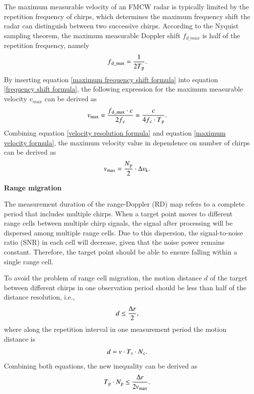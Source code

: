\documentclass[12pt,DIV14,BCOR12mm,a4paper,footinclude=false,headinclude,parskip=half-,twoside,openright,cleardoublepage=empty,toc=index,bibliography=totoc,listof=totoc]{scrreprt}
\numberwithin{equation}{chapter}
\begin{document}
The maximum measurable velocity of an FMCW radar is typically limited by the repetition frequency of chirps, which determines the maximum frequency shift the radar can distinguish between two successive chirps. According to the Nyquist sampling theorem, the maximum measurable Doppler shift $f_{d \_ max}$ is half of the repetition frequency, namely
\begin{equation}
    \centering
    f\textsubscript{d\_max} = \frac{1}{2T\textsubscript{p}}.
    \label{maximum frequency shift formula}
\end{equation}
By inserting equation \ref{maximum frequency shift formula} into equation \ref{frequency shift formula}, the following expression for the maximum measurable velocity $v_{max}$ can be derived as
\begin{equation}
    \centering
    v\textsubscript{max} = \frac{f\textsubscript{d\_max} \cdot c}{2f\textsubscript{c}} = \frac{c}{4f\textsubscript{c} \cdot T\textsubscript{p}}.
    \label{maximum velocity formula}
\end{equation}
Combining equation \ref{velocity resolution formula} and equation \ref{maximum velocity formula}, the maximum velocity value in dependence on number of chirps can be derived as
\begin{equation}
    \centering
    v\textsubscript{max} = \frac{N\textsubscript{p}}{2} \cdot \Delta v\textsubscript{k}.
    \label{maximum velocity in dependence on number of chirps formula}
\end{equation}

\begin{spacing}{1.5}
\textbf{\large{Range migration}}
\end{spacing}

The measurement duration of the range-Doppler (RD) map refers to a complete period that includes multiple chirps. When a target point moves to different range cells between multiple chirp signals, the signal after processing will be dispersed among multiple range cells. Due to this dispersion, the signal-to-noise ratio (SNR) in each cell will decrease, given that the noise power remains constant. Therefore, the target point should be able to ensure falling within a single range cell.

To avoid the problem of range cell migration, the motion distance $d$ of the target between different chirps in one observation period should be less than half of the distance resolution, i.e.,
\begin{equation}
    \centering
    d \leq \frac{\Delta r}{2},
\end{equation}
where along the repetition interval in one measurement period the motion distance is
\begin{equation}
    \centering
    d = v \cdot T\textsubscript{r} \cdot N\textsubscript{c}.
\end{equation}
Combining both equations, the new inequality can be derived as
\begin{equation}
    \centering
    T\textsubscript{p} \cdot N\textsubscript{p} \leq \frac{\Delta r}{2v\textsubscript{max}}.
    \label{radar migration formula}
\end{equation}
\end{document}
